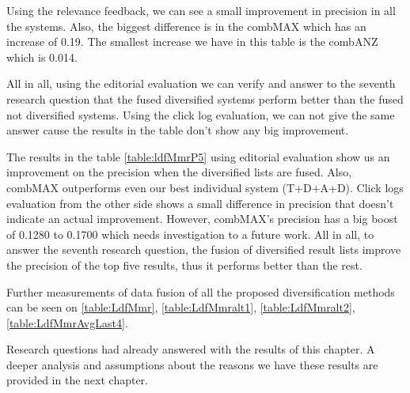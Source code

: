 Using the relevance feedback, we can see a small improvement in precision in all the systems. Also, the biggest difference is in the combMAX which has an increase of 0.19. The smallest increase we have in this table is the combANZ which is 0.014.

All in all, using the editorial evaluation we can verify and answer to the seventh research question that the fused diversified systems perform better than the fused not diversified systems. Using the click log evaluation, we can not give the same answer cause the results in the table don't show any big improvement.



The results in the table \ref{table:ldfMmrP5} using editorial evaluation show us an improvement on the precision when the diversified lists are fused. Also, combMAX outperforms even our best individual system (T+D+A+D).  Click logs evaluation from the other side shows a small difference in precision that doesn't indicate an actual improvement. However, combMAX's precision has a big boost of 0.1280 to 0.1700 which needs investigation to a future work. All in all, to answer the seventh research question, the fusion of diversified result lists improve the precision of the top five results, thus it performs better than the rest.

Further measurements of data fusion of all the proposed diversification methods can be seen on \ref{table:LdfMmr}, \ref{table:LdfMmralt1}, \ref{table:LdfMmralt2}, \ref{table:LdfMmrAvgLast4}.



Research questions had already answered with the results of this chapter. A deeper analysis and assumptions about the reasons we have these results are provided in the next chapter.
